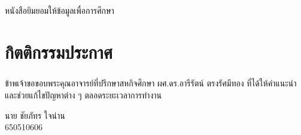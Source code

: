 \documentclass[a4paper,12pt]{report}
\newcommand{\thaipagenum}{
  \ifcase\value{page}
    \or ก%
    \or ข%
    \or ค%
    \or ง%
    \or จ%
    \or ฉ%
    \or ช%
    \or ซ%
    \or ฌ%
    \else หน้า~\thepage %
  \fi
}
\begin{document}
\newpage
\clearpage
\thispagestyle{empty}
\setcounter{page}{0}
หนังสือยิมยอมให้ข้อมูลเพื่อการศึกษา

\newpage
\clearpage
\renewcommand{\thepage}{\thaipagenum}
\setcounter{page}{1}

\chapter*{กิตติกรรมประกาศ}
\paragraph{} ข้าพเจ้าขอขอบพระคุณอาจารย์ที่ปรึกษาสหกิจศึกษา ผศ.ดร.อารีรัตน์ ตรงรัศมีทอง ที่ได้ให้คำแนะนำ
และช่วยแก้ไขปัญหาต่าง ๆ ตลอดระยะเวลาการทำงาน
\begin{flushright}
    นาย ชัยภัทร ใจน่าน\\
    650510606
\end{flushright}
\end{document}
